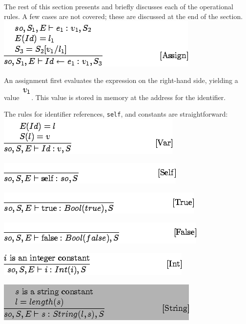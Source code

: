 \documentclass[]{article}
\begin{document}
The rest of this section presents and briefly discusses each of the
operational rules. A few cases are not covered; these are discussed at
the end of the section. \\

\includegraphics{img157.png}

An assignment first evaluates the expression on the right-hand side,
yielding a value \includegraphics{img158.png}. This value is stored in
memory at the address for the identifier.

The rules for identifier references, \texttt{self}, and constants are
straightforward: \\

\includegraphics{img159.png}

\includegraphics{img160.png}

\includegraphics{img161.png}

\includegraphics{img162.png}

\includegraphics{img163.png}

\includegraphics{img164.png}
\end{document}
